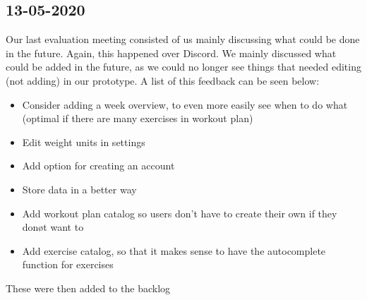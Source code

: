 \documentclass{article}
\begin{document}
\subsection*{13-05-2020}
Our last evaluation meeting consisted of us mainly discussing what could be done in the future. Again, this happened over Discord. We mainly discussed what could be added in the future, as we could no longer see things that needed editing (not adding) in our prototype. A list of this feedback can be seen below:
\begin{itemize}
\item Consider adding a week overview, to even more easily see when to do what (optimal if there are many exercises in workout plan)
\item Edit weight units in settings
\item Add option for creating an account
\item Store data in a better way
\item Add workout plan catalog so users don't have to create their own if they donøt want to
\item Add exercise catalog, so that it makes sense to have the autocomplete function for exercises
\end{itemize}
These were then added to the backlog
\end{document}
